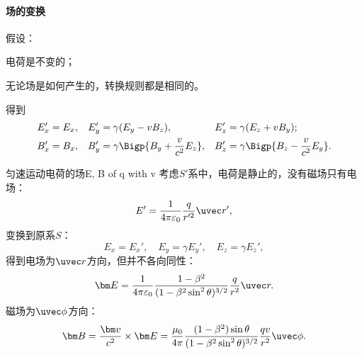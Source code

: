 \paragraph{场的变换}
假设：
\begin{compactenum}
	\item 电荷是不变的；
	\item 无论场是如何产生的，转换规则都是相同的。
\end{compactenum}
得到
\begin{align}
    E_x'&=E_x,&E_y'&=\gamma(E_y-vB_z),&E_z'&=\gamma(E_z+vB_y);\\
    B_x'&=B_x,&B_y'&=\gamma\Bigp{B_y+\frac v{c^2}E_z},&B_z'&=\gamma\Bigp{B_z-\frac v{c^2}E_y}.
\end{align}
\begin{example}{匀速运动电荷的场}{E, B of q with v}
    考虑$S'$系中，电荷是静止的，没有磁场只有电场：
    \[
        E'=\frac1{4\pi\varepsilon_0}\frac q{r'^2}\uvec r',
    \]
    变换到原系$S$：
    \[
        E_x=E_x',\quad E_y=\gamma E_y',\quad E_z=\gamma E_z',
    \]
    得到电场为$\uvec r$方向，但并不各向同性：
    \begin{equation}
        \bm E=\frac1{4\pi\varepsilon_0}\frac{1-\beta^2}{(1-\beta^2\sin^2\theta)^{3/2}}\frac q{r^2}\uvec r.
    \end{equation}
    磁场为$\uvec\phi$方向：
    \begin{equation}
        \bm B=\frac{\bm v}{c^2}\times\bm E=\frac{\mu_0}{4\pi}\frac{(1-\beta^2)\sin\theta}{(1-\beta^2\sin^2\theta)^{3/2}}\frac{qv}{r^2}\uvec\phi.
    \end{equation}
\end{example}
